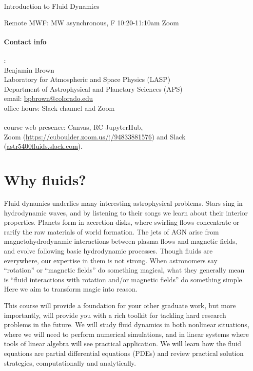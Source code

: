 \documentclass[12pt, preprint]{aastex}
\begin{document}
{\Huge Introduction to Fluid Dynamics}

Remote MWF: MW asynchronous, F 10:20-11:10am Zoom

\paragraph{Contact info}:\\
Benjamin Brown\\
Laboratory for Atmospheric and Space Physics (LASP)\\
Department of Astrophysical and Planetary Sciences (APS)\\
email: \href{bpbrown@colorado.edu}{bpbrown@colorado.edu}\\
office hours: Slack channel and Zoom \\
~\\
course web presence: Canvas, RC JupyterHub, \\
Zoom (\href{https://cuboulder.zoom.us/j/94833881576
}{https://cuboulder.zoom.us/j/94833881576}) and
Slack (\href{astr5400fluids.slack.com}{astr5400fluids.slack.com}).

\vspace{-0.5cm}

\section*{Why fluids?}

Fluid dynamics underlies many interesting astrophysical problems.  Stars sing in hydrodynamic waves, and by listening to their songs we learn about their interior properties.  Planets form in accretion disks, where swirling flows concentrate or rarify the raw materials of world formation.  The jets of AGN arise from magnetohydrodynamic interactions between plasma flows and magnetic fields, and evolve following basic hydrodynamic processes.  Though fluids are everywhere, our expertise in them is not strong.  When astronomers say ``rotation'' or ``magnetic fields'' do something magical, what they generally mean is ``fluid interactions with rotation and/or magnetic fields'' do something simple.  Here we aim to transform magic into reason.


This course will provide a foundation for your other graduate work, but more importantly, will provide you with a rich toolkit for tackling hard research problems in the future.  We will study fluid dynamics in both nonlinear situations, where we will need to perform numerical simulations, and in linear systems where tools of linear algebra will see practical application.  We will learn how the fluid equations are partial differential equations (PDEs) and review practical solution strategies, computationally and analytically.
\end{document}
